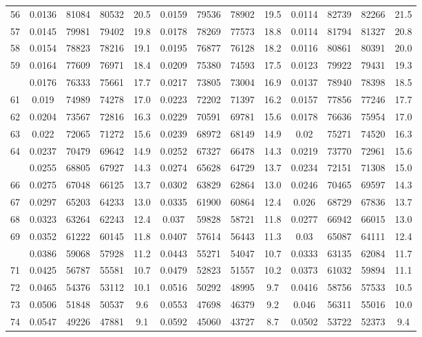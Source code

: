 \documentclass[
  14pt,
]{article}
\begin{document}
\begin{longtable}[t]{lcccccccccccc}
56 & 0.0136 & 81084 & 80532 & 20.5 & 0.0159 & 79536 & 78902 & 19.5 & 0.0114 & 82739 & 82266 & 21.5\\
57 & 0.0145 & 79981 & 79402 & 19.8 & 0.0178 & 78269 & 77573 & 18.8 & 0.0114 & 81794 & 81327 & 20.8\\
58 & 0.0154 & 78823 & 78216 & 19.1 & 0.0195 & 76877 & 76128 & 18.2 & 0.0116 & 80861 & 80391 & 20.0\\
59 & 0.0164 & 77609 & 76971 & 18.4 & 0.0209 & 75380 & 74593 & 17.5 & 0.0123 & 79922 & 79431 & 19.3\\
\addlinespace
60 & 0.0176 & 76333 & 75661 & 17.7 & 0.0217 & 73805 & 73004 & 16.9 & 0.0137 & 78940 & 78398 & 18.5\\
61 & 0.019 & 74989 & 74278 & 17.0 & 0.0223 & 72202 & 71397 & 16.2 & 0.0157 & 77856 & 77246 & 17.7\\
62 & 0.0204 & 73567 & 72816 & 16.3 & 0.0229 & 70591 & 69781 & 15.6 & 0.0178 & 76636 & 75954 & 17.0\\
63 & 0.022 & 72065 & 71272 & 15.6 & 0.0239 & 68972 & 68149 & 14.9 & 0.02 & 75271 & 74520 & 16.3\\
64 & 0.0237 & 70479 & 69642 & 14.9 & 0.0252 & 67327 & 66478 & 14.3 & 0.0219 & 73770 & 72961 & 15.6\\
\addlinespace
65 & 0.0255 & 68805 & 67927 & 14.3 & 0.0274 & 65628 & 64729 & 13.7 & 0.0234 & 72151 & 71308 & 15.0\\
66 & 0.0275 & 67048 & 66125 & 13.7 & 0.0302 & 63829 & 62864 & 13.0 & 0.0246 & 70465 & 69597 & 14.3\\
67 & 0.0297 & 65203 & 64233 & 13.0 & 0.0335 & 61900 & 60864 & 12.4 & 0.026 & 68729 & 67836 & 13.7\\
68 & 0.0323 & 63264 & 62243 & 12.4 & 0.037 & 59828 & 58721 & 11.8 & 0.0277 & 66942 & 66015 & 13.0\\
69 & 0.0352 & 61222 & 60145 & 11.8 & 0.0407 & 57614 & 56443 & 11.3 & 0.03 & 65087 & 64111 & 12.4\\
\addlinespace
70 & 0.0386 & 59068 & 57928 & 11.2 & 0.0443 & 55271 & 54047 & 10.7 & 0.0333 & 63135 & 62084 & 11.7\\
71 & 0.0425 & 56787 & 55581 & 10.7 & 0.0479 & 52823 & 51557 & 10.2 & 0.0373 & 61032 & 59894 & 11.1\\
72 & 0.0465 & 54376 & 53112 & 10.1 & 0.0516 & 50292 & 48995 & 9.7 & 0.0416 & 58756 & 57533 & 10.5\\
73 & 0.0506 & 51848 & 50537 & 9.6 & 0.0553 & 47698 & 46379 & 9.2 & 0.046 & 56311 & 55016 & 10.0\\
74 & 0.0547 & 49226 & 47881 & 9.1 & 0.0592 & 45060 & 43727 & 8.7 & 0.0502 & 53722 & 52373 & 9.4\\

\end{longtable}
\end{document}
